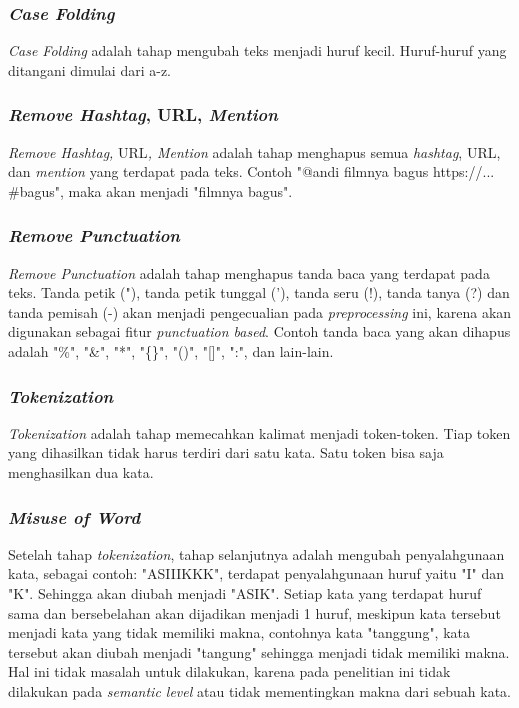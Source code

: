 \subsubsection{\textit{Case Folding}}
\textit{Case Folding }adalah tahap mengubah teks menjadi huruf kecil. 
Huruf-huruf yang ditangani dimulai dari a-z.
\subsubsection{\textit{Remove Hashtag}, URL, \textit{Mention}}
\textit{Remove Hashtag, }URL\textit{, Mention }adalah tahap 
menghapus semua \textit{hashtag}, URL, dan \textit{mention }yang 
terdapat pada teks. Contoh "@andi filmnya bagus https://... \#bagus", 
maka akan menjadi "filmnya bagus".
\subsubsection{\textit{Remove Punctuation}}
\textit{Remove Punctuation }adalah tahap menghapus tanda baca yang 
terdapat pada teks. Tanda petik ("), tanda petik tunggal ('), tanda 
seru (!), tanda tanya (?) dan tanda pemisah (-) akan menjadi 
pengecualian pada \textit{preprocessing }ini, karena akan digunakan 
sebagai fitur \textit{punctuation based}. Contoh tanda baca yang akan 
dihapus adalah "\%", "\&", "*", "\{\}", "()", "[]", ":", dan lain-lain.
\subsubsection{\textit{Tokenization}}
\textit{Tokenization} adalah tahap memecahkan kalimat menjadi 
token-token. Tiap token yang dihasilkan tidak harus terdiri dari satu 
kata. Satu token bisa saja menghasilkan dua kata. 
\subsubsection{\textit{Misuse of Word}}
Setelah tahap \textit{tokenization}, tahap selanjutnya adalah 
mengubah penyalahgunaan kata, sebagai contoh: "ASIIIKKK", terdapat 
penyalahgunaan huruf yaitu "I" dan "K". Sehingga akan diubah menjadi 
"ASIK". Setiap kata yang terdapat huruf sama dan bersebelahan akan 
dijadikan menjadi 1 huruf, meskipun kata tersebut menjadi kata yang 
tidak memiliki makna, contohnya kata "tanggung", kata tersebut akan 
diubah menjadi "tangung" sehingga menjadi tidak memiliki makna. Hal 
ini tidak masalah untuk dilakukan, karena pada penelitian ini tidak 
dilakukan pada \textit{semantic level} atau tidak mementingkan makna 
dari sebuah kata.  
